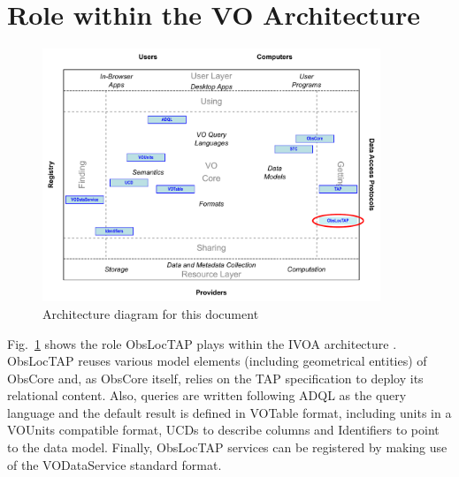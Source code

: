 \documentclass[11pt,a4paper]{ivoa}
\begin{document}
\section*{Role within the VO Architecture}


\begin{figure}
\centering


\includegraphics[width=0.9\textwidth]{role_diagram.pdf}
\caption{Architecture diagram for this document}
\label{fig:archdiag}
\end{figure}


Fig.~\ref{fig:archdiag} shows the role ObsLocTAP plays within the
IVOA architecture \citep{note:VOARCH}. ObsLocTAP reuses various model elements (including geometrical entities) of ObsCore and, 
as ObsCore itself, relies on the TAP specification to deploy its relational content.
Also, queries are written following ADQL as the query language and the default result is defined
in VOTable format, including units in a VOUnits compatible format, UCDs to
describe columns and Identifiers to point to the data model. Finally, ObsLocTAP
services can be registered by making use of the VODataService standard format.
\end{document}
